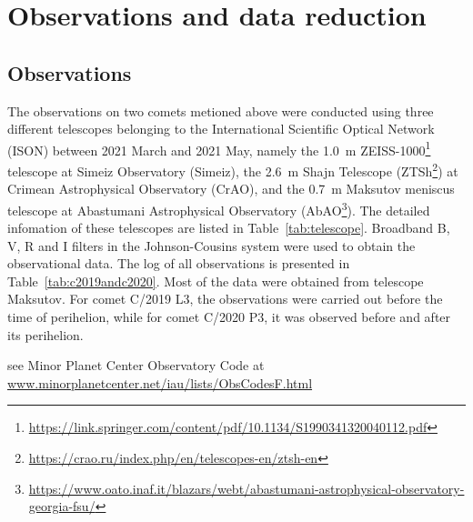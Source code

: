 \section{Observations and data reduction} \label{sec:obs_data}

\subsection{Observations}

The observations on two comets metioned above were conducted using three different telescopes belonging to the International Scientific Optical Network (ISON) between 2021 March and 2021 May, namely the {\qty{1.0}{\m}} ZEISS-1000\footnote{\url{https://link.springer.com/content/pdf/10.1134/S1990341320040112.pdf}} 
telescope at Simeiz Observatory (Simeiz), the {\qty{2.6}{\m}} Shajn Telescope (ZTSh\footnote{\url{https://crao.ru/index.php/en/telescopes-en/ztsh-en}}) 
at Crimean Astrophysical Observatory (CrAO), and the {\qty{0.7}{\m}} Maksutov meniscus telescope at Abastumani Astrophysical Observatory (AbAO\footnote{\url{https://www.oato.inaf.it/blazars/webt/abastumani-astrophysical-observatory-georgia-fsu/}}). 
The detailed infomation of these telescopes are listed in Table~\ref{tab:telescope}. Broadband B, V, R and I filters in the Johnson-Cousins system were used to obtain the observational data. The log of all observations is presented in Table~\ref{tab:c2019andc2020}. Most of the data were obtained from telescope Maksutov. For comet C/2019 L3, the observations were carried out before the time of perihelion, while for comet C/2020 P3, it was observed before and after its perihelion. 

\begin{table}
    \centering
    \caption{Information of instrunments used. }\label{tab:telescope}
    \begin{threeparttable}
        \begin{tablenotes}
            \item[1] see Minor Planet Center Observatory Code at \\
            \url{www.minorplanetcenter.net/iau/lists/ObsCodesF.html}
        \end{tablenotes}
    \end{threeparttable}
\end{table}

